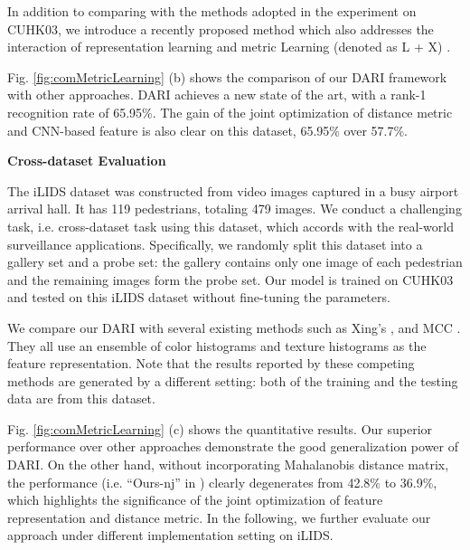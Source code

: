\documentclass[letterpaper]{article}
\begin{document}
In addition to comparing with the methods adopted in the experiment on CUHK03, we introduce a recently proposed method which also addresses the interaction of representation learning and metric Learning (denoted as L + X) \cite{liao2015person}.



Fig. \ref{fig:comMetricLearning} (b) shows the comparison of our DARI framework with other approaches. DARI achieves a new state of the art, with a rank-1 recognition rate of 65.95\%. The gain of the joint optimization of distance metric and CNN-based feature is also clear on this dataset, 65.95\% over 57.7\%.

\textbf{Cross-dataset Evaluation}

The iLIDS dataset \cite{zheng2009people} was constructed from video images captured in a busy airport arrival hall. It has 119 pedestrians, totaling 479 images. We conduct a challenging task, i.e. cross-dataset task using this dataset, which accords with the real-world surveillance applications. Specifically, we randomly split this dataset into a gallery set and a probe set: the gallery contains only one image of each pedestrian and the remaining images form the probe set. Our model is trained on CUHK03 and tested on this iLIDS dataset without fine-tuning the parameters.

We compare our DARI with several existing methods such as Xing's \cite{xing2002distance}, and MCC \cite{globerson2005metric}. They all use an ensemble of color histograms and texture histograms as the feature representation. Note that the results reported by these competing methods are generated by a different setting: both of the training and the testing data are from this dataset.

Fig. \ref{fig:comMetricLearning} (c) shows the quantitative results. Our superior performance over other approaches demonstrate the good generalization power of DARI. On the other hand, without incorporating Mahalanobis distance matrix, the performance (i.e. ``Ours-nj'' in ) clearly degenerates from 42.8\% to 36.9\%, which highlights the significance of the joint optimization of feature representation and distance metric. In the following, we further evaluate our approach under different implementation setting on iLIDS.
\end{document}
